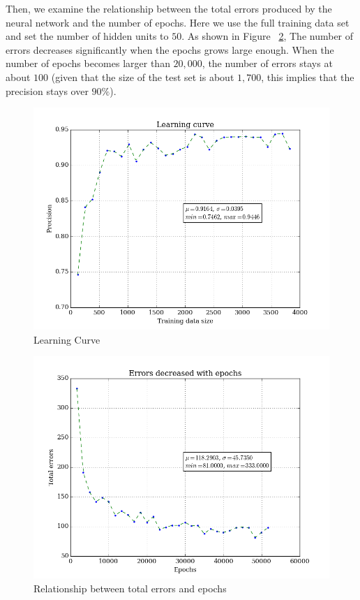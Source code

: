 \documentclass{article}
\begin{document}
Then, we examine the relationship between the total errors produced by the neural network and the number of epochs. Here we use the full training data set and set the number of hidden units to $50$. As shown in Figure ~\ref{fig:error}, The number of errors decreases significantly when the epochs grows large enough. When the number of epochs becomes larger than $20, 000$, the number of errors stays at about $100$ (given that the size of the test set is about $1,700$, this implies that the precision stays over $90\%$).

\begin{figure}[H]
\centering
\includegraphics[width=400pt]{../asset/learning-curve.png}
\caption{Learning Curve}
\label{fig:curve}
\end{figure}

\begin{figure}[H]
\centering
\includegraphics[width=400pt]{../asset/error-curve.png}
\caption{Relationship between total errors and epochs}
\label{fig:error}
\end{figure}
\end{document}
